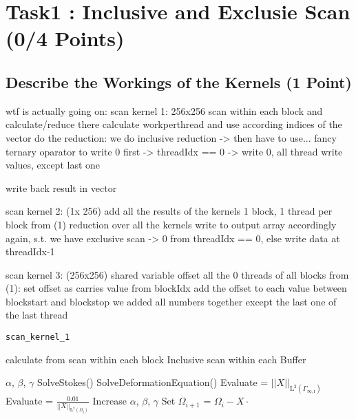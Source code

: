 \section{Task1 : Inclusive and Exclusie Scan (0/4 Points)}
\subsection{Describe the Workings of the Kernels (1 Point)}
wtf is actually going on:
scan kernel 1: 256x256
scan within each block and calculate/reduce there
calculate workperthread and use according indices of the vector
do the reduction:
we do inclusive reduction -> then have to use...
fancy ternary oparator to write 0 first -> threadIdx == 0 -> write 0, all thread write values, except last one
 
write back result in vector
 
scan kernel 2: (1x 256)
add all the results of the kernels
1 block, 1 thread per block from (1)
reduction over all the kernels
write to output array accordingly again, s.t. we have exclusive scan
-> 0 from threadIdx == 0, else write data at threadIdx-1
 
scan kernel 3: (256x256)
shared variable offset
all the 0 threads of all blocks from (1):
set offset as carries value from blockIdx
add the offset to each value between blockstart and blockstop
 we added all numbers together except the last one of the last thread




\begin{algorithm}
	\renewcommand{\thealgorithm}{}
	\caption{\texttt{scan\_kernel\_1}}
	\begin{algorithmic}[1]
    \State calculate  from  
    \State scan within each block 
    \State Inclusive scan within each Buffer
    \State 
    \State 
    
	\State {}
	\State {} $\alpha$, $\beta$, $\gamma$ 
		\State SolveStokes() 
		\State SolveDeformationEquation() 
		\State Evaluate  = $ || X ||_{\mathrm{L}^2(\Gamma_{\infty , \mathrm{i}})} $
		\State Evaluate  = $ \frac{0.01}{|| X ||_{\mathrm{L}^2(\Omega_{\mathrm{i}})}} $
			\State Increase $\alpha$, $\beta$, $\gamma$
			\State {}
		\EndIf
		\EndIf
		\State Set $\Omega_{i+1}$ =  $\Omega_i - X \cdot$  
	\EndFor
	\end{algorithmic}
\end{algorithm}

